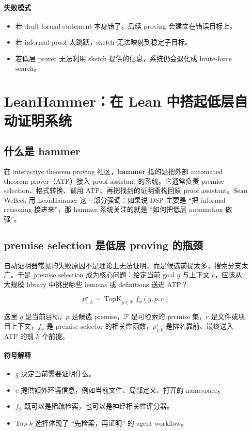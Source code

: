\documentclass[a4paper]{article}
\begin{document}
\paragraph{失败模式}
\begin{itemize}
\item 若 draft formal statement 本身错了，后续 proving 会建立在错误目标上。
\item 若 informal proof 太跳跃，sketch 无法映射到稳定子目标。
\item 若低层 prover 无法利用 sketch 提供的信息，系统仍会退化成 brute-force search。
\end{itemize}

\section{LeanHammer：在 Lean 中搭起低层自动证明系统}

\subsection{什么是 hammer}

在 interactive theorem proving 社区，\textbf{hammer} 指的是把外部 automated theorem prover（ATP）接入 proof assistant 的系统。它通常负责 premise selection、格式转换、调用 ATP、再把找到的证明重构回原 proof assistant。Sean Welleck 用 LeanHammer 这一部分强调：如果说 DSP 主要是 ``把 informal reasoning 接进来''，那 hammer 系统关注的就是 ``如何把低层 automation 做强''。

\subsection{premise selection 是低层 proving 的瓶颈}

自动证明器常见的失败原因不是理论上无法证明，而是候选前提太多，搜索分支太广。于是 premise selection 成为核心问题：给定当前 goal $g$ 与上下文 $c$，应该从大规模 library 中挑出哪些 lemmas 或 definitions 送进 ATP？

\[
p^{\star}_{1:k} = \operatorname{TopK}_{p \in \mathcal{P}} f_{\phi}(g, p, c)
\]

这里 $g$ 是当前目标，$p$ 是候选 premise，$\mathcal{P}$ 是可检索的 premise 集，$c$ 是文件或项目上下文，$f_{\phi}$ 是 premise selector 的相关性函数，$p^{\star}_{1:k}$ 是排名靠前、最终送入 ATP 的前 $k$ 个前提。

\paragraph{符号解释}
\begin{itemize}
\item $g$ 决定当前需要证明什么。
\item $c$ 提供额外环境信息，例如当前文件、局部定义、打开的 namespace。
\item $f_{\phi}$ 既可以是稀疏检索，也可以是神经相关性评分器。
\item Top-$k$ 选择体现了 ``先检索，再证明'' 的 agent workflow。
\end{itemize}
\end{document}
